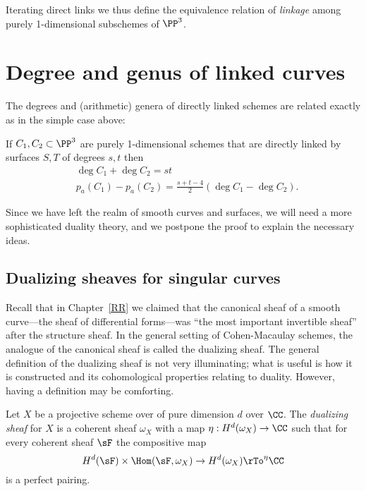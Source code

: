 Iterating direct links we thus define the equivalence relation of \emph{linkage} among purely 1-dimensional subschemes
of $\PP^3$.

\section{Degree and genus of linked curves}

The degrees and (arithmetic) genera 
of directly linked schemes are related exactly as in the simple case above:

\begin{theorem}\label{direct linkage}\label{linked genus formula}
If $C_1,{C_2}\subset \PP^3$ are purely 1-dimensional schemes that are directly linked by surfaces $S,T$ of degrees $s,t$  then 
$$
\begin{aligned}
&\deg C_1+\deg C_2 = st\\
&p_a(C_1) - p_a({C_2}) = \frac{s+t-4}{2}(\deg C_1-\deg {C_2}).
\end{aligned}
 $$
\end{theorem}

Since we have left the realm of smooth curves and surfaces, we will need a more sophisticated duality theory, and we
postpone the proof to explain the necessary ideas.



\subsection{Dualizing sheaves for singular curves}\label{duality}

Recall that in Chapter~\ref{RR} we claimed that the canonical sheaf of a smooth curve---the sheaf of differential forms---was ``the most important invertible sheaf'' after the structure sheaf. In the general setting of Cohen-Macaulay schemes, the analogue of the canonical sheaf is called the dualizing sheaf.
The general definition of the dualizing sheaf is not very illuminating; what is useful is how it is constructed and its cohomological properties relating to duality.
However, having a definition may be comforting. 

\begin{definition}
Let $X$ be a projective scheme over of pure dimension $d$ over $\CC$. The \emph{dualizing sheaf} for $X$ is a coherent sheaf $\omega_X$ 
with a map $\eta: H^d(\omega_X) \to \CC$ such that for every coherent sheaf  $\sF$ the compositive map
$$
H^d(\sF) \times \Hom(\sF, \omega_X) \to H^d(\omega_X) \rTo^\eta \CC
$$
is a perfect pairing. 
\end{definition}

